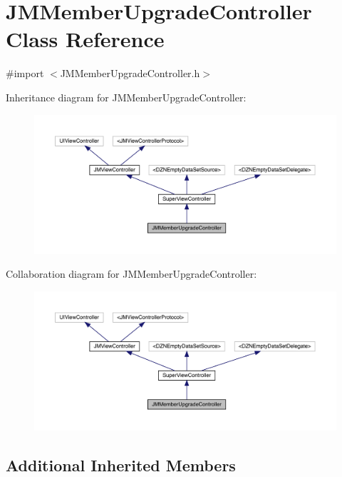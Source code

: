 \hypertarget{interface_j_m_member_upgrade_controller}{}\section{J\+M\+Member\+Upgrade\+Controller Class Reference}
\label{interface_j_m_member_upgrade_controller}


{\ttfamily \#import $<$J\+M\+Member\+Upgrade\+Controller.\+h$>$}



Inheritance diagram for J\+M\+Member\+Upgrade\+Controller\+:\nopagebreak
\begin{figure}[H]
\begin{center}
\leavevmode
\includegraphics[width=350pt]{interface_j_m_member_upgrade_controller__inherit__graph}
\end{center}
\end{figure}


Collaboration diagram for J\+M\+Member\+Upgrade\+Controller\+:\nopagebreak
\begin{figure}[H]
\begin{center}
\leavevmode
\includegraphics[width=350pt]{interface_j_m_member_upgrade_controller__coll__graph}
\end{center}
\end{figure}
\subsection*{Additional Inherited Members}


